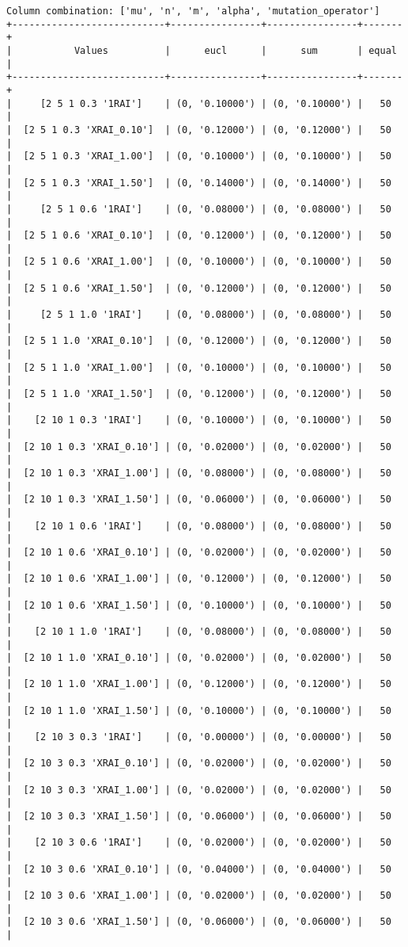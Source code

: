 \documentclass{article}
\begin{document}
\begin{verbatim}
Column combination: ['mu', 'n', 'm', 'alpha', 'mutation_operator']
+---------------------------+----------------+----------------+-------+
|           Values          |      eucl      |      sum       | equal |
+---------------------------+----------------+----------------+-------+
|     [2 5 1 0.3 '1RAI']    | (0, '0.10000') | (0, '0.10000') |   50  |
|  [2 5 1 0.3 'XRAI_0.10']  | (0, '0.12000') | (0, '0.12000') |   50  |
|  [2 5 1 0.3 'XRAI_1.00']  | (0, '0.10000') | (0, '0.10000') |   50  |
|  [2 5 1 0.3 'XRAI_1.50']  | (0, '0.14000') | (0, '0.14000') |   50  |
|     [2 5 1 0.6 '1RAI']    | (0, '0.08000') | (0, '0.08000') |   50  |
|  [2 5 1 0.6 'XRAI_0.10']  | (0, '0.12000') | (0, '0.12000') |   50  |
|  [2 5 1 0.6 'XRAI_1.00']  | (0, '0.10000') | (0, '0.10000') |   50  |
|  [2 5 1 0.6 'XRAI_1.50']  | (0, '0.12000') | (0, '0.12000') |   50  |
|     [2 5 1 1.0 '1RAI']    | (0, '0.08000') | (0, '0.08000') |   50  |
|  [2 5 1 1.0 'XRAI_0.10']  | (0, '0.12000') | (0, '0.12000') |   50  |
|  [2 5 1 1.0 'XRAI_1.00']  | (0, '0.10000') | (0, '0.10000') |   50  |
|  [2 5 1 1.0 'XRAI_1.50']  | (0, '0.12000') | (0, '0.12000') |   50  |
|    [2 10 1 0.3 '1RAI']    | (0, '0.10000') | (0, '0.10000') |   50  |
|  [2 10 1 0.3 'XRAI_0.10'] | (0, '0.02000') | (0, '0.02000') |   50  |
|  [2 10 1 0.3 'XRAI_1.00'] | (0, '0.08000') | (0, '0.08000') |   50  |
|  [2 10 1 0.3 'XRAI_1.50'] | (0, '0.06000') | (0, '0.06000') |   50  |
|    [2 10 1 0.6 '1RAI']    | (0, '0.08000') | (0, '0.08000') |   50  |
|  [2 10 1 0.6 'XRAI_0.10'] | (0, '0.02000') | (0, '0.02000') |   50  |
|  [2 10 1 0.6 'XRAI_1.00'] | (0, '0.12000') | (0, '0.12000') |   50  |
|  [2 10 1 0.6 'XRAI_1.50'] | (0, '0.10000') | (0, '0.10000') |   50  |
|    [2 10 1 1.0 '1RAI']    | (0, '0.08000') | (0, '0.08000') |   50  |
|  [2 10 1 1.0 'XRAI_0.10'] | (0, '0.02000') | (0, '0.02000') |   50  |
|  [2 10 1 1.0 'XRAI_1.00'] | (0, '0.12000') | (0, '0.12000') |   50  |
|  [2 10 1 1.0 'XRAI_1.50'] | (0, '0.10000') | (0, '0.10000') |   50  |
|    [2 10 3 0.3 '1RAI']    | (0, '0.00000') | (0, '0.00000') |   50  |
|  [2 10 3 0.3 'XRAI_0.10'] | (0, '0.02000') | (0, '0.02000') |   50  |
|  [2 10 3 0.3 'XRAI_1.00'] | (0, '0.02000') | (0, '0.02000') |   50  |
|  [2 10 3 0.3 'XRAI_1.50'] | (0, '0.06000') | (0, '0.06000') |   50  |
|    [2 10 3 0.6 '1RAI']    | (0, '0.02000') | (0, '0.02000') |   50  |
|  [2 10 3 0.6 'XRAI_0.10'] | (0, '0.04000') | (0, '0.04000') |   50  |
|  [2 10 3 0.6 'XRAI_1.00'] | (0, '0.02000') | (0, '0.02000') |   50  |
|  [2 10 3 0.6 'XRAI_1.50'] | (0, '0.06000') | (0, '0.06000') |   50  |

\end{verbatim}
\end{document}
